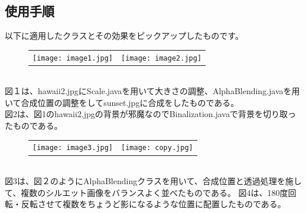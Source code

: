 \documentclass{jsarticle}
\begin{document}
\subsection{使用手順}
以下に適用したクラスとその効果をピックアップしたものです。\\
\begin{figure}[h]
    \begin{tabular}{cc}
      \begin{minipage}[t]{0.45\hsize}
        \centering
        \texttt{[image: image1.jpg]}
        \caption{}
      \end{minipage} &
      \hspace{3mm}
      \begin{minipage}[t]{0.45\hsize}
        \centering
        \texttt{[image: image2.jpg]}
        \caption{}
      \end{minipage}
    \end{tabular}
  \end{figure}
  \\
図１は、hawaii2.jpgにScale.javaを用いて大きさの調整、AlphaBlending.javaを用いて合成位置の調整をしてsunset.jpgに合成をしたものである。\\
図2は、図1のhawaii2.jpgの背景が邪魔なのでBinalization.javaで背景を切り取ったものである。
\begin{figure}[h]
    \begin{tabular}{cc}
      \begin{minipage}[t]{0.45\hsize}
        \centering
        \texttt{[image: image3.jpg]}
        \caption{}
      \end{minipage} &
      \hspace{3mm}
      \begin{minipage}[t]{0.45\hsize}
        \centering
        \texttt{[image: copy.jpg]}
        \caption{}
      \end{minipage}
    \end{tabular}
  \end{figure}
  \\
  図3は、図２のようにAlphaBlendingクラスを用いて、合成位置と透過処理を施して、複数のシルエット画像をバランスよく並べたものである。
  図4は、180度回転・反転させて複数をちょうど影になるような位置に配置したものである。
\newpage
\end{document}
